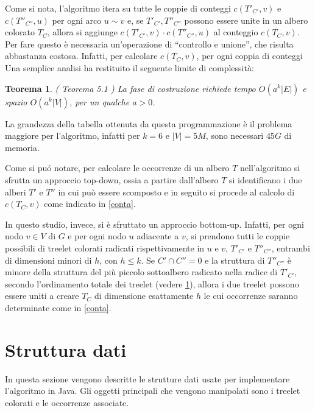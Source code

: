 Come si nota, l'algoritmo itera su tutte le coppie di conteggi $ c(T'_{C'},v) $ e $ c(T''_{C''},u) $ per ogni arco $ u\sim v $ e, se $ T'_{C'}, T''_{C''}  $  possono essere unite in un albero colorato $ T_C $, allora si aggiunge $ c(T'_{C'},v) \cdot c(T''_{C''},u)  $ al conteggio $ c(T_C,v) $.
Per fare questo \`e necessaria un'operazione di ``controllo e unione'', che risulta abbastanza costosa.
Infatti, per calcolare $ c(T_C,v) $, per ogni coppia di conteggi 
Una semplice analisi ha restituito il seguente limite di complessit\`a:

\newtheorem{teorema}{Teorema}[section]
\begin{teorema}
	(\cite{bressan2018motif} \textit{Teorema 5.1} ) La fase di costruzione richiede tempo $ O(a^{k}|E|) $ e spazio $ O(a^{k}|V|) $, per un qualche $ a > 0 $.
	
\end{teorema}

La grandezza della tabella ottenuta da questa programmazione \`e il problema maggiore per l'algoritmo, infatti per $ k=6 $ e $ |V| = 5M $, sono necessari $ 45G $ di memoria.

Come si pu\'o notare, per calcolare le occorrenze di un albero $ T $ nell'algoritmo si sfrutta un approccio top-down, ossia a partire dall'albero $ T $ si identificano i due alberi $ T' $ e $ T'' $ in cui pu\`o essere scomposto e in seguito si procede al calcolo di $ c(T_C,v) $ come indicato in \ref{conta}.

In questo studio, invece, si \`e sfruttato un approccio bottom-up. Infatti, per ogni nodo $ v \in V $ di $ G $ e per ogni nodo $ u $  adiacente a $v$, si prendono tutti le coppie possibili di treelet colorati radicati rispettivamente in $ u $ e $ v $, $ T'_{C'} $ e $ T''_{C''} $, entrambi di dimensioni minori di $ h $, con $ h \le k $.
Se $ C' \cap C'' = 0 $ e la struttura di $ T''_{C''} $ \`e minore della struttura del pi\`u piccolo sottoalbero radicato nella radice di $ T'_{C'} $, secondo l'ordinamento totale dei treelet (vedere \ref{section 2}), allora i due treelet possono essere uniti a creare $ T_C $ di dimensione esattamente $ h $ le cui occorrenze saranno determinate come in \ref{conta}.

\section{Struttura dati}
\label{section 2}
In questa sezione vengono descritte le strutture dati usate per implementare l'algoritmo in Java.
Gli oggetti principali che vengono manipolati sono i treelet colorati e le occorrenze associate.

